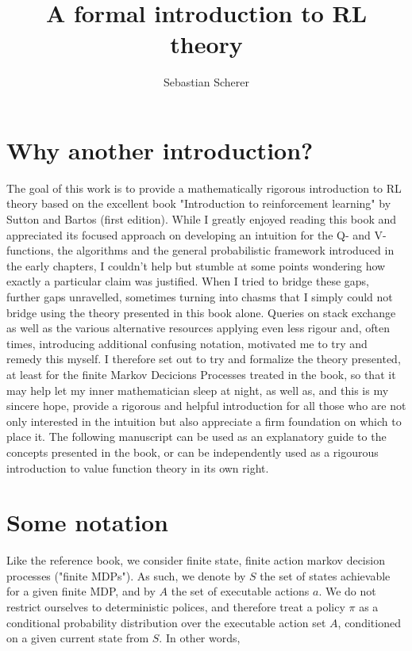 \documentclass[11pt]{article} %
\title{A formal introduction to RL theory}
\author{Sebastian Scherer}
\begin{document}
\maketitle

\section{Why another introduction?}

The goal of this work is to provide a mathematically rigorous introduction to RL theory based on the excellent book "Introduction to reinforcement learning" by Sutton and Bartos (first edition). While I greatly enjoyed reading this book and appreciated its focused approach on developing an intuition for the Q- and V-functions, the algorithms and the general probabilistic framework introduced in the early chapters, I couldn't help but stumble at some points wondering how exactly a particular claim was justified. When I tried to bridge these gaps, further gaps unravelled, sometimes turning into chasms that I simply could not bridge using the theory presented in this book alone.  Queries on stack exchange as well as the various alternative resources applying even less rigour and, often times, introducing additional confusing notation, motivated me to  try and remedy this myself. I therefore set out to try and formalize the theory presented, at least for the finite Markov Decicions Processes treated in the book, so that it may help let my inner mathematician sleep at night, as well as, and this is my sincere hope, provide a rigorous and helpful introduction for all those who are not only interested in the intuition but also appreciate a firm foundation on which to place it. The following manuscript can be used as an explanatory guide to the concepts presented in the book, or can be independently used as a rigourous introduction to value function theory in its own right.

\section{Some notation}

Like the reference book, we consider finite state, finite action markov decision processes ("finite MDPs"). As such, we denote by $S$ the set of states achievable for a given finite MDP, and by $A$ the set of executable actions $a$. We do not restrict ourselves to deterministic polices, and therefore treat a policy $\pi$ as a conditional probability distribution over the executable action set $A$, conditioned on a given current state from $S$. In other words, 
\end{document}
